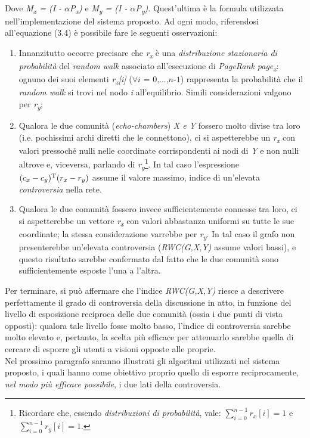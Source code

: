 \begin{enumerate}
\begin{equation}
\end{equation}
\\
Dove \textit{M\textsubscript{x} = (I - $\alpha$P\textsubscript{x})} e \textit{M\textsubscript{y} = (I - $\alpha$P\textsubscript{y})}. Quest'ultima è la formula utilizzata nell'implementazione del sistema proposto. Ad ogni modo, riferendosi all'equazione (3.4) è possibile fare le seguenti osservazioni:
\begin{enumerate}
\item Innanzitutto occorre precisare che \textit{r\textsubscript{x}} è una \textit{distribuzione stazionaria di probabilità} del \textit{random walk} associato all'esecuzione di \textit{PageRank page\textsubscript{x}}: ognuno dei suoi elementi \textit{r\textsubscript{x}[i]} ($\forall \textit{i = 0,...,n-1}$) rappresenta la probabilità che il \textit{random walk} si trovi nel nodo \textit{i} all'equilibrio. Simili considerazioni valgono per \textit{r\textsubscript{y}};
\item Qualora le due comunità (\textit{echo-chambers}) \textit{X e Y} fossero molto divise tra loro (i.e. pochissimi archi diretti che le connettono), ci si aspetterebbe un \textit{r\textsubscript{x}} con valori pressoché nulli nelle coordinate corrispondenti ai nodi di \textit{Y} e non nulli altrove e, viceversa, parlando di \textit{r\textsubscript{y}}\footnote{Ricordare che, essendo \textit{distribuzioni di probabilità}, vale: $\sum_{i=0}^{n-1} r_x[i] = 1$ e $\sum_{i=0}^{n-1} r_y[i] = 1$.}. In tal caso l'espressione $(c_x - c_y)\textsuperscript{T}(r_x - r_y)$ assume il valore massimo, indice di un'elevata \textit{controversia} nella rete.
\item Qualora le due comunità fossero invece sufficientemente connesse tra loro, ci si aspetterebbe un vettore \textit{r\textsubscript{x}} con valori abbastanza uniformi su tutte le sue coordinate; la stessa considerazione varrebbe per \textit{r\textsubscript{y}}. In tal caso il grafo non presenterebbe un'elevata controversia (\textit{RWC(G,X,Y)} assume valori bassi), e questo risultato sarebbe confermato dal fatto che le due comunità sono sufficientemente esposte l'una a l'altra.
\end{enumerate}
\end{enumerate}
Per terminare, si può affermare che l'indice \textit{RWC(G,X,Y)} riesce a descrivere perfettamente il grado di controversia della discussione in atto, in funzione del livello di esposizione reciproca delle due comunità (ossia i due punti di vista opposti): qualora tale livello fosse molto basso, l'indice di controversia sarebbe molto elevato e, pertanto, la scelta più efficace per attenuarlo sarebbe quella di cercare di esporre gli utenti a visioni opposte alle proprie. 
\\Nel prossimo paragrafo saranno illustrati gli algoritmi utilizzati nel sistema proposto, i quali hanno come obiettivo proprio quello di esporre reciprocamente, \textit{nel modo più efficace possibile}, i due lati della controversia. 

